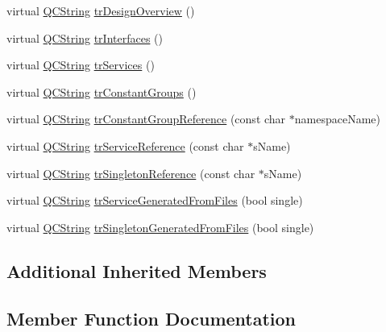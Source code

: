 \begin{DoxyCompactItemize}
\item 
virtual \mbox{\hyperlink{class_q_c_string}{Q\+C\+String}} \mbox{\hyperlink{class_translator_chinese_ab87b8ec483b194f324179da30953da9d}{tr\+Design\+Overview}} ()
\item 
virtual \mbox{\hyperlink{class_q_c_string}{Q\+C\+String}} \mbox{\hyperlink{class_translator_chinese_ae406583bd351cfadaa6f9249e25a0fd4}{tr\+Interfaces}} ()
\item 
virtual \mbox{\hyperlink{class_q_c_string}{Q\+C\+String}} \mbox{\hyperlink{class_translator_chinese_a35780d2e80c5822148089f3e659ed637}{tr\+Services}} ()
\item 
virtual \mbox{\hyperlink{class_q_c_string}{Q\+C\+String}} \mbox{\hyperlink{class_translator_chinese_a73e86493a6caff2f52c9d82a2ffaab84}{tr\+Constant\+Groups}} ()
\item 
virtual \mbox{\hyperlink{class_q_c_string}{Q\+C\+String}} \mbox{\hyperlink{class_translator_chinese_aa97e586e644632b27b2e671834171bac}{tr\+Constant\+Group\+Reference}} (const char $\ast$namespace\+Name)
\item 
virtual \mbox{\hyperlink{class_q_c_string}{Q\+C\+String}} \mbox{\hyperlink{class_translator_chinese_a544a88b436eab3df6726d41c7629af93}{tr\+Service\+Reference}} (const char $\ast$s\+Name)
\item 
virtual \mbox{\hyperlink{class_q_c_string}{Q\+C\+String}} \mbox{\hyperlink{class_translator_chinese_a75d26d62856fec425adc3c89983c1b24}{tr\+Singleton\+Reference}} (const char $\ast$s\+Name)
\item 
virtual \mbox{\hyperlink{class_q_c_string}{Q\+C\+String}} \mbox{\hyperlink{class_translator_chinese_a671d2015874c4f74364b07e27ba278e6}{tr\+Service\+Generated\+From\+Files}} (bool single)
\item 
virtual \mbox{\hyperlink{class_q_c_string}{Q\+C\+String}} \mbox{\hyperlink{class_translator_chinese_a5ff94253b9445e10473aae6b459a1b9a}{tr\+Singleton\+Generated\+From\+Files}} (bool single)
\end{DoxyCompactItemize}
\subsection*{Additional Inherited Members}


\subsection{Member Function Documentation}
\mbox{\label{class_translator_chinese_a76318096a57cb3970e9c09b51d8ef215}} 
